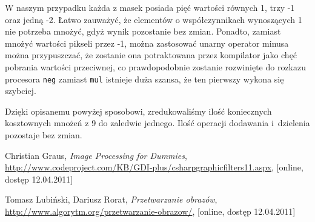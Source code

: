 \documentclass{classrep}
\begin{document}
W naszym przypadku każda z masek posiada pięć wartości równych 1, trzy -1 oraz jedną -2. Łatwo zauważyć, że elementów o współczynnikach wynoszących 1 nie potrzeba mnożyć, gdyż wynik pozostanie bez zmian. Ponadto, zamiast mnożyć wartości pikseli przez -1, można zastosować unarny operator minusa \ppauza można przypuszczać, że zostanie ona potraktowana przez kompilator jako chęć pobrania wartości przeciwnej, co prawdopodobnie zostanie rozwinięte do rozkazu procesora \verb|neg| zamiast \verb|mul| \ppauza istnieje duża szansa, że ten pierwszy wykona się szybciej.

Dzięki opisanemu powyżej sposobowi, zredukowaliśmy ilość koniecznych kosztownych mnożeń z 9 do zaledwie jednego. Ilość operacji dodawania i~dzielenia pozostaje bez zmian.

\begin{thebibliography}{99}
Christian Graus, \textit{Image Processing for Dummies}, \url{http://www.codeproject.com/KB/GDI-plus/csharpgraphicfilters11.aspx}, [online, dostęp 12.04.2011]

Tomasz Lubiński, Dariusz Rorat, \textit{Przetwarzanie obrazów}, \url{http://www.algorytm.org/przetwarzanie-obrazow/}, [online, dostęp 12.04.2011]
\end{thebibliography}
\end{document}
